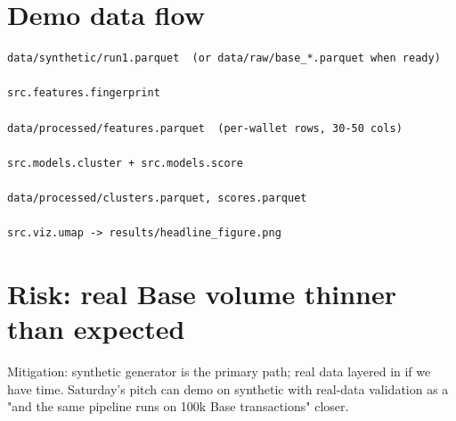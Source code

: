\documentclass[11pt]{article}
\begin{document}
\section{Demo data flow}
\begin{lstlisting}
data/synthetic/run1.parquet  (or data/raw/base_*.parquet when ready)
    
src.features.fingerprint
    
data/processed/features.parquet  (per-wallet rows, 30-50 cols)
    
src.models.cluster + src.models.score
    
data/processed/clusters.parquet, scores.parquet
    
src.viz.umap -> results/headline_figure.png
\end{lstlisting}
\section{Risk: real Base volume thinner than expected}
Mitigation: synthetic generator is the primary path; real data layered in if we have time. Saturday's pitch can demo on synthetic with real-data validation as a "and the same pipeline runs on 100k Base transactions" closer.
\end{document}
